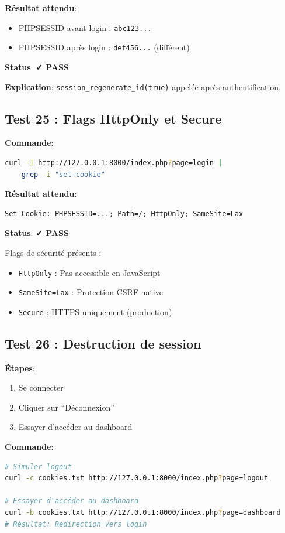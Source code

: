 \documentclass[11pt,a4paper,french]{report}
\newcommand{\pass}{\cellcolor{pass}\textbf{\color{white}✓ PASS}}
\begin{document}
\textbf{Résultat attendu}:
\begin{itemize}
    \item PHPSESSID avant login : \texttt{abc123...}
    \item PHPSESSID après login : \texttt{def456...} (différent)
\end{itemize}

\textbf{Status}: \pass

\textbf{Explication}: \texttt{session\_regenerate\_id(true)} appelée après authentification.

\subsection{Test 25 : Flags HttpOnly et Secure}

\textbf{Commande}:
\begin{lstlisting}[language=bash]
curl -I http://127.0.0.1:8000/index.php?page=login | 
    grep -i "set-cookie"
\end{lstlisting}

\textbf{Résultat attendu}:
\begin{lstlisting}
Set-Cookie: PHPSESSID=...; Path=/; HttpOnly; SameSite=Lax
\end{lstlisting}

\textbf{Status}: \pass

Flags de sécurité présents :
\begin{itemize}
    \item \texttt{HttpOnly} : Pas accessible en JavaScript
    \item \texttt{SameSite=Lax} : Protection CSRF native
    \item \texttt{Secure} : HTTPS uniquement (production)
\end{itemize}

\subsection{Test 26 : Destruction de session}

\textbf{Étapes}:
\begin{enumerate}
    \item Se connecter
    \item Cliquer sur ``Déconnexion''
    \item Essayer d'accéder au dashboard
\end{enumerate}

\textbf{Commande}:
\begin{lstlisting}[language=bash]
# Simuler logout
curl -c cookies.txt http://127.0.0.1:8000/index.php?page=logout

# Essayer d'accéder au dashboard
curl -b cookies.txt http://127.0.0.1:8000/index.php?page=dashboard
# Résultat: Redirection vers login
\end{lstlisting}
\end{document}
